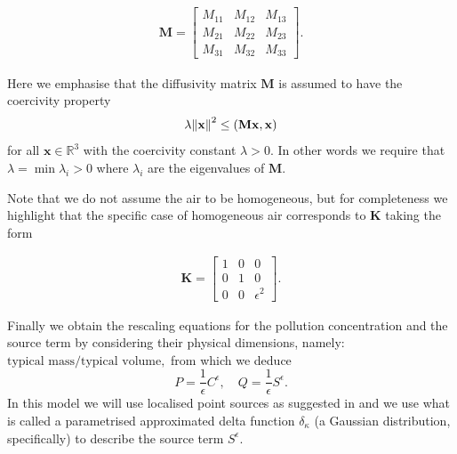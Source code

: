 \documentclass[11pt]{article}
\begin{document}
\begin{gather}
\mathbf{M}
=
\begin{bmatrix}
M_{11} & M_{12} & M_{13} \\ M_{21} & M_{22} & M_{23} \\ M_{31} & M_{32} & M_{33}
\end{bmatrix}.
\end{gather}

Here we emphasise that the diffusivity matrix $\mathbf{M}$ is assumed to have the coercivity property
%
\begin{equation} \label{coercivity}
\lambda \norm{\mathbf{x}}^2 \leq (\mathbf{M} \mathbf{x}, \mathbf{x})
\end{equation}
%
for all $\mathbf{x} \in \mathbb{R}^3$ with the coercivity constant $\lambda > 0.$ In other words we require that $\lambda = \min {\lambda_i} > 0$ where $\lambda_i$ are the eigenvalues of $\mathbf{M}.$

Note that we do not assume the air to be homogeneous, but for completeness we highlight that the specific case of homogeneous air corresponds to $\mathbf{K}$ taking the form

\begin{gather} \nonumber
\mathbf{K}
=
\begin{bmatrix}
1 & 0 & 0 \\ 0 & 1 & 0 \\ 0 & 0 & \epsilon^2
\end{bmatrix}.
\end{gather}

Finally we obtain the rescaling equations for the pollution concentration and the source term by considering their physical dimensions, namely: $\text{typical mass} / \text{typical volume},$ from which we deduce
%
\begin{equation}
P = \frac{1}{\epsilon} C^\epsilon, \quad Q = \frac{1}{\epsilon} S^\epsilon.
\end{equation}
%
In this model we will use localised point sources as suggested in \cite{zhuk2016source} and we use what is called a parametrised approximated delta function $\delta_\kappa$ (a Gaussian distribution, specifically) to describe the source term $S^\epsilon$.
\end{document}
